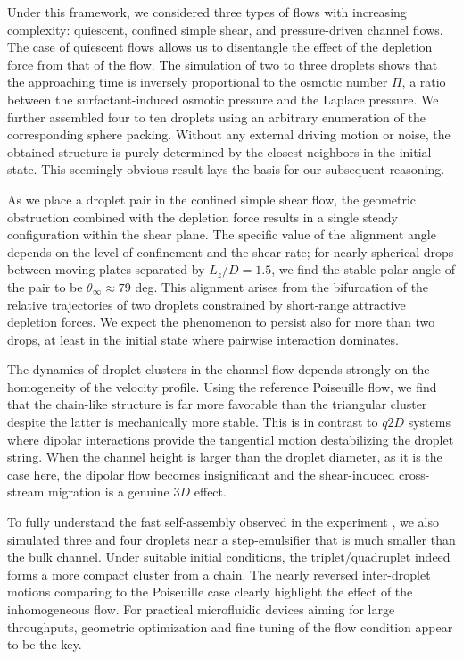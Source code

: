 Under this framework, we considered three types of flows with increasing complexity: quiescent, confined simple shear, and pressure-driven channel flows. The case of quiescent flows allows us to disentangle the effect of the depletion force from that of the flow. The simulation of two to three droplets shows that the approaching time is inversely proportional to the osmotic number $\Pi$, a ratio between the surfactant-induced osmotic pressure and the Laplace pressure. We further assembled four to ten droplets using an arbitrary enumeration of the corresponding sphere packing. Without any external driving motion or noise, the obtained structure is purely determined by the closest neighbors in the initial state. This seemingly obvious result lays the basis for our subsequent reasoning.

As we place a droplet pair in the confined simple shear flow, the geometric obstruction combined with the depletion force results in a single steady configuration within the shear plane. The specific value of the alignment angle depends on the level of confinement and the shear rate; for nearly spherical drops between moving plates separated by $L_z/D =1.5$, we find the stable polar angle of the pair to be $\theta_\infty \approx 79$ deg. This alignment arises from the bifurcation of the relative trajectories of two droplets constrained by short-range attractive depletion forces. We expect the phenomenon to persist also for more than two drops, at least in the initial state where pairwise interaction dominates.

The dynamics of droplet clusters in the channel flow depends strongly on the homogeneity of the velocity profile. Using the reference Poiseuille flow, we find that the chain-like structure is far more favorable than the triangular cluster despite the latter is mechanically more stable. This is in contrast to $q2D$ systems where dipolar interactions provide the tangential motion destabilizing the droplet string. When the channel height is larger than the droplet diameter, as it is the case here, the dipolar flow becomes insignificant and the shear-induced cross-stream migration is a genuine $3D$ effect.

To fully understand the fast self-assembly observed in the experiment \cite{Shen_2016AS}, we also simulated three and four droplets near a step-emulsifier that is much smaller than the bulk channel. Under suitable initial conditions, the triplet/quadruplet indeed forms a more compact cluster from a chain. The nearly reversed inter-droplet motions comparing to the Poiseuille case clearly highlight the effect of the inhomogeneous flow. For practical microfluidic devices aiming for large throughputs, geometric optimization and fine tuning of the flow condition appear to be the key.

